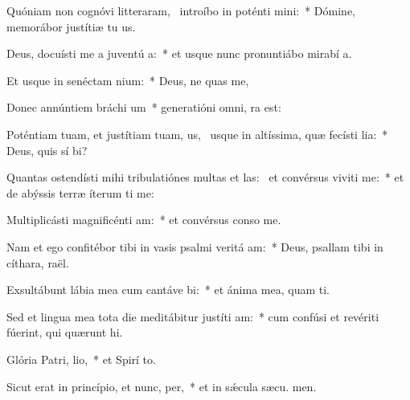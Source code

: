 \item Quóniam non cognóvi litteraram,~\pscross{} introíbo in poténti mini:~* Dómine, memorábor justítiæ tu us.
\item Deus, docuísti me a juventú a:~* et usque nunc pronuntiábo mirabí a.
\item Et usque in senéctam  nium:~* Deus, ne quas me,
\item Donec annúntiem bráchi um~* generatióni omni,  ra est:
\item Poténtiam tuam, et justítiam tuam, us,~\pscross{} usque in altíssima, quæ fecísti lia:~* Deus, quis sí bi?
\item Quantas ostendísti mihi tribulatiónes multas et las:~\pscross{} et convérsus viviti me:~* et de abýssis terræ íterum ti me:
\item Multiplicásti magnificénti am:~* et convérsus conso  me.
\item Nam et ego confitébor tibi in vasis psalmi veritá am:~* Deus, psallam tibi in cíthara,  raël.
\item Exsultábunt lábia mea cum cantáve bi:~* et ánima mea, quam ti.
\item Sed et lingua mea tota die meditábitur justíti am:~* cum confúsi et revériti fúerint, qui quærunt  hi.
\item Glória Patri,  lio,~* et Spirí to.
\item Sicut erat in princípio, et nunc,  per,~* et in sǽcula sæcu. men.
